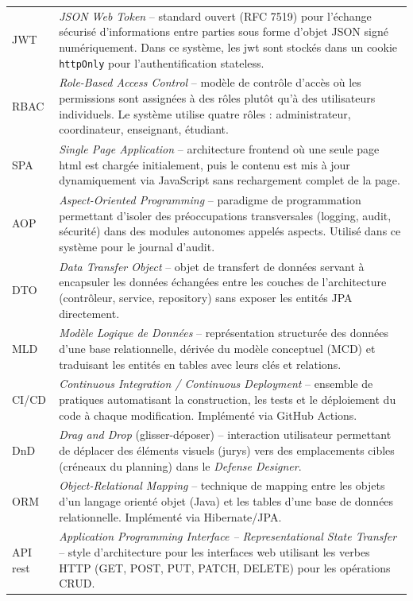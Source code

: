 \begin{xltabular}{\textwidth}{lX}
    JWT & \textit{JSON Web Token} -- standard ouvert (RFC 7519) pour l'échange sécurisé d'informations entre parties sous forme d'objet JSON signé numériquement. Dans ce système, les \acrshort{jwt} sont stockés dans un cookie \texttt{httpOnly} pour l'authentification stateless. \\
    RBAC & \textit{Role-Based Access Control} -- modèle de contrôle d'accès où les permissions sont assignées à des rôles plutôt qu'à des utilisateurs individuels. Le système utilise quatre rôles : administrateur, coordinateur, enseignant, étudiant. \\
    SPA & \textit{Single Page Application} -- architecture frontend où une seule page \acrshort{html} est chargée initialement, puis le contenu est mis à jour dynamiquement via JavaScript sans rechargement complet de la page. \\
    AOP & \textit{Aspect-Oriented Programming} -- paradigme de programmation permettant d'isoler des préoccupations transversales (logging, audit, sécurité) dans des modules autonomes appelés aspects. Utilisé dans ce système pour le journal d'audit. \\
    DTO & \textit{Data Transfer Object} -- objet de transfert de données servant à encapsuler les données échangées entre les couches de l'architecture (contrôleur, service, repository) sans exposer les entités JPA directement. \\
    MLD & \textit{Modèle Logique de Données} -- représentation structurée des données d'une base relationnelle, dérivée du modèle conceptuel (MCD) et traduisant les entités en tables avec leurs clés et relations. \\
    CI/CD & \textit{Continuous Integration / Continuous Deployment} -- ensemble de pratiques automatisant la construction, les tests et le déploiement du code à chaque modification. Implémenté via GitHub Actions. \\
    DnD & \textit{Drag and Drop} (glisser-déposer) -- interaction utilisateur permettant de déplacer des éléments visuels (jurys) vers des emplacements cibles (créneaux du planning) dans le \textit{Defense Designer}. \\
    ORM & \textit{Object-Relational Mapping} -- technique de mapping entre les objets d'un langage orienté objet (Java) et les tables d'une base de données relationnelle. Implémenté via Hibernate/JPA. \\
    API \acrshort{rest} & \textit{Application Programming Interface -- Representational State Transfer} -- style d'architecture pour les interfaces web utilisant les verbes HTTP (GET, POST, PUT, PATCH, DELETE) pour les opérations CRUD. \\

\end{xltabular}
